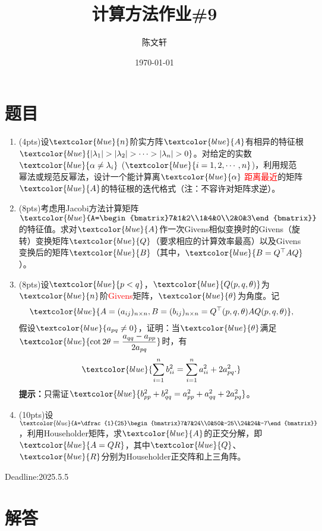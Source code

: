 \documentclass[cn,hazy,green,11pt,normal]{elegantnote}
\title{计算方法作业\#9}
\author{陈文轩}
\institute{KFRC}
\date{\today}
\begin{document}
\maketitle

\section{题目}


    \begin{enumerate}

    \item (4pts)设$\textcolor{blue}{n}$阶实方阵$\textcolor{blue}{A}$有相异的特征根$\textcolor{blue}{|\lambda_1|>|\lambda_2|>\cdots>|\lambda_n|>0}$。对给定的实数$\textcolor{blue}{\alpha\neq\lambda_i}$ ($\textcolor{blue}{i=1,2,\cdots,n}$)，利用规范幂法或规范反幂法，设计一个能计算离$\textcolor{blue}{\alpha}$ \textcolor{red}{距离最近}的矩阵$\textcolor{blue}{A}$的特征根的迭代格式（注：不容许对矩阵求逆）。

    \item (8pts)考虑用Jacobi方法计算矩阵$\textcolor{blue}{A=\begin{bmatrix}7&1&2\\1&4&0\\2&0&3\end{bmatrix}}$的特征值。求对$\textcolor{blue}{A}$作一次Givens相似变换时的Givens（旋转）变换矩阵$\textcolor{blue}{Q}$（要求相应的计算效率最高）以及Givens变换后的矩阵$\textcolor{blue}{B}$（其中，$\textcolor{blue}{B=Q^{\top} AQ}$）。

    \item (8pts)设$\textcolor{blue}{p<q}$，$\textcolor{blue}{Q(p,q,\theta)}$为$\textcolor{blue}{n}$阶\textcolor{red}{Givens}矩阵，$\textcolor{blue}{\theta}$为角度。记\[\textcolor{blue}{A=(a_{ij})_{n\times n},B=(b_{ij})_{n\times n}=Q^{\top}(p,q,\theta)AQ(p,q,\theta)},\]假设$\textcolor{blue}{a_{pq}\neq0}$，证明：当$\textcolor{blue}{\theta}$满足$\textcolor{blue}{\cot2\theta= \dfrac{a_{qq}-a_{pp}}{2a_{pq}}}$时，有\[\textcolor{blue}{\sum_{i=1}^{n}b_{ii}^2=\sum_{i=1}^{n}a_{ii}^2+2a_{pq}^2.}\]\textbf{提示：}只需证$\textcolor{blue}{b_{pp}^2+b_{qq}^2=a_{pp}^2+a_{qq}^2+2a_{pq}^2}$。

    \item (10pts)设$\textcolor{blue}{A=\dfrac{1}{25}\begin{bmatrix}7&7&24\\0&50&-25\\24&24&-7\end{bmatrix}}$，利用Householder矩阵，求$\textcolor{blue}{A}$的正交分解，即$\textcolor{blue}{A=QR}$，其中$\textcolor{blue}{Q}$、$\textcolor{blue}{R}$分别为Householder正交阵和上三角阵。

\end{enumerate}

    Deadline:2025.5.5

\section{解答}
\end{document}
